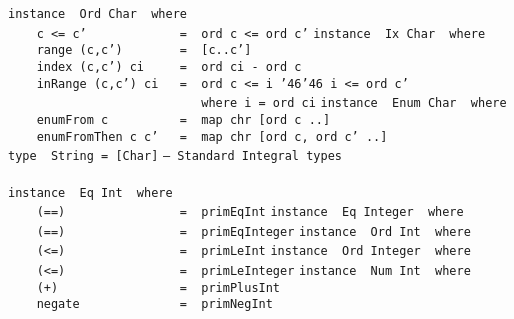 \mbox{\tt instance\ \ Ord\ Char\ \ where}\\
\mbox{\tt \ \ \ \ c\ <=\ c'\ \ \ \ \ \ \ \ \ \ \ \ \ =\ \ ord\ c\ <=\ ord\ c'}
%
\eprogB\noindent\bprogB
\mbox{\tt instance\ \ Ix\ Char\ \ where}\\
\mbox{\tt \ \ \ \ range\ (c,c')\ \ \ \ \ \ \ \ =\ \ [c..c']}\\
\mbox{\tt \ \ \ \ index\ (c,c')\ ci\ \ \ \ \ =\ \ ord\ ci\ -\ ord\ c}\\
\mbox{\tt \ \ \ \ inRange\ (c,c')\ ci\ \ \ =\ \ ord\ c\ <=\ i\ {\char'46}{\char'46}\ i\ <=\ ord\ c'}\\
\mbox{\tt \ \ \ \ \ \ \ \ \ \ \ \ \ \ \ \ \ \ \ \ \ \ \ \ \ \ \ where\ i\ =\ ord\ ci}
%
\eprogB\noindent\bprogB
\mbox{\tt instance\ \ Enum\ Char\ \ where}\\
\mbox{\tt \ \ \ \ enumFrom\ c\ \ \ \ \ \ \ \ \ \ =\ \ map\ chr\ [ord\ c\ ..]}\\
\mbox{\tt \ \ \ \ enumFromThen\ c\ c'\ \ \ =\ \ map\ chr\ [ord\ c,\ ord\ c'\ ..]}
%
\eprogB\noindent\bprogB
\mbox{\tt type\ \ String\ =\ [Char]}
%
\eprogB\noindent\bprogB
\mbox{\tt --\ Standard\ Integral\ types}\\
\mbox{\tt }\\[-8pt]
\mbox{\tt instance\ \ Eq\ Int\ \ where}\\
\mbox{\tt \ \ \ \ (==)\ \ \ \ \ \ \ \ \ \ \ \ \ \ \ \ =\ \ primEqInt}
%
\eprogB\noindent\bprogB
\mbox{\tt instance\ \ Eq\ Integer\ \ where}\\
\mbox{\tt \ \ \ \ (==)\ \ \ \ \ \ \ \ \ \ \ \ \ \ \ \ =\ \ primEqInteger}
%
\eprogB\noindent\bprogB
\mbox{\tt instance\ \ Ord\ Int\ \ where}\\
\mbox{\tt \ \ \ \ (<=)\ \ \ \ \ \ \ \ \ \ \ \ \ \ \ \ =\ \ primLeInt}
%
\eprogB\noindent\bprogB
\mbox{\tt instance\ \ Ord\ Integer\ \ where}\\
\mbox{\tt \ \ \ \ (<=)\ \ \ \ \ \ \ \ \ \ \ \ \ \ \ \ =\ \ primLeInteger}
%
\eprogB\noindent\bprogB
\mbox{\tt instance\ \ Num\ Int\ \ where}\\
\mbox{\tt \ \ \ \ (+)\ \ \ \ \ \ \ \ \ \ \ \ \ \ \ \ \ =\ \ primPlusInt}\\
\mbox{\tt \ \ \ \ negate\ \ \ \ \ \ \ \ \ \ \ \ \ \ =\ \ primNegInt}\\
